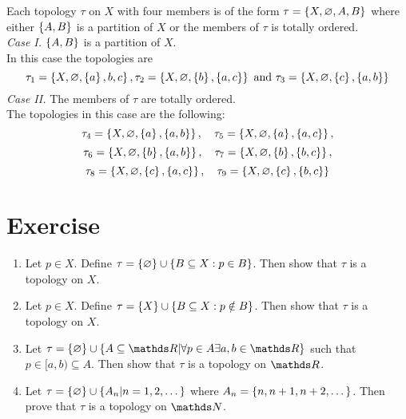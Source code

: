 \documentclass[../main-sheet.tex]{subfiles}
\begin{document}
\begin{soln}
    Each topology  \(\tau\) on  \(X\) with four members is of the form  \(\tau = \left\{X,\varnothing,A,B\right\}\) where either  \(\left\{A,B\right\}\) is a partition of  \(X\) or
    the members of  \(\tau\) is totally ordered.\\
    \emph{Case I.}  \(\left\{A,B\right\}\) is a partition of  \(X\).\\
    In this case the topologies are
    \[\tau_1=\left\{X,\varnothing,\left\{a\right\},{b,c}\right\}, \tau_2 = \left\{X,\varnothing,\left\{b\right\},\left\{a,c\right\}\right\} \text{ and } \tau_3=\left\{X,\varnothing,\left\{c\right\},\left\{a,b\right\}\right\}\]
    \emph{Case II.} The members of  \(\tau\) are totally ordered.\\
    The topologies in this case are the following:\\
    \[\tau_4 =\left\{X,\varnothing,\left\{a\right\},\left\{a,b\right\}\right\},\quad \tau_5 =\left\{X,\varnothing,\left\{a\right\},\left\{a,c\right\}\right\},\]
    \[\tau_6 =\left\{X,\varnothing,\left\{b\right\},\left\{a,b\right\}\right\},\quad \tau_7 = \left\{X,\varnothing,\left\{b\right\},\left\{b,c\right\}\right\},\]
    \[\tau_8 = \left\{X,\varnothing,\left\{c\right\},\left\{a,c\right\}\right\},\quad \tau_9 =\left\{X,\varnothing,\left\{c\right\},\left\{b,c\right\}\right\}\]
\end{soln}
\section{Exercise}
\begin{enumerate}
    \item Let  \(p \in X\). Define  \(\tau = \left\{\varnothing\right\} \cup \left\{B\subseteq X: p \in B\right\}\). Then show that  \(\tau\) is a topology on  \(X\).
    \item Let  \(p \in X\). Define  \(\tau=\left\{X\right\}\cup \left\{B \subseteq X:p\notin B\right\}\). Then show that  \(\tau\) is a topology on  \(X\).
    \item  Let  \(\tau = \set{\varnothing} \cup \set{A \subseteq \R\vert \forall p \in A \exists a, b \in \R}\) such that  \(p \in [a,b) \subseteq A\). Then show that  \(\tau\) is a topology on  \(\R\).
    \item  Let  \(\tau = \left\{\varnothing\right\} \cup \left\{A_n\vert n = 1,2,\dots\right\}\) where  \(A_n = \left\{n,n + 1,n + 2,\dots\right\}\). Then prove that  \(\tau\) is a topology on  \(\N\).
\end{enumerate}
\end{document}
